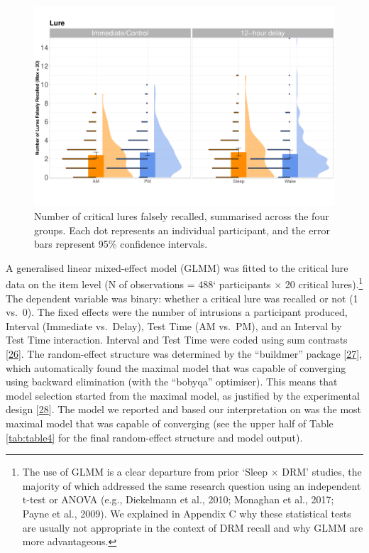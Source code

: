 \documentclass[
]{article}
\begin{document}
\begin{figure}

{\centering \includegraphics{Figures/luregraph} 

}

\caption{Number of critical lures falsely recalled, summarised across the four groups. Each dot represents an individual participant, and the error bars represent 95\% confidence intervals.}\label{fig:lurefig}
\end{figure}

A generalised linear mixed-effect model (GLMM) was fitted to the critical lure data on the item level (N of observations = 488` participants \(\times\) 20 critical lures).\footnote{The use of GLMM is a clear departure from prior ‘Sleep $\times$ DRM’ studies, the majority of which addressed the same research question using an independent t-test or ANOVA (e.g., Diekelmann et al., 2010; Monaghan et al., 2017; Payne et al., 2009). We explained in Appendix C why these statistical tests are usually not appropriate in the context of DRM recall and why GLMM are more advantageous.} The dependent variable was binary: whether a critical lure was recalled or not (1 vs.~0). The fixed effects were the number of intrusions a participant produced, Interval (Immediate vs.~Delay), Test Time (AM vs.~PM), and an Interval by Test Time interaction. Interval and Test Time were coded using sum contrasts {[}\protect\hyperlink{ref-barr2019a}{26}{]}. The random-effect structure was determined by the ``buildmer'' package {[}\protect\hyperlink{ref-voeten2021a}{27}{]}, which automatically found the maximal model that was capable of converging using backward elimination (with the ``bobyqa'' optimiser). This means that model selection started from the maximal model, as justified by the experimental design {[}\protect\hyperlink{ref-barr2013a}{28}{]}. The model we reported and based our interpretation on was the most maximal model that was capable of converging (see the upper half of Table \ref{tab:table4} for the final random-effect structure and model output).
\end{document}
